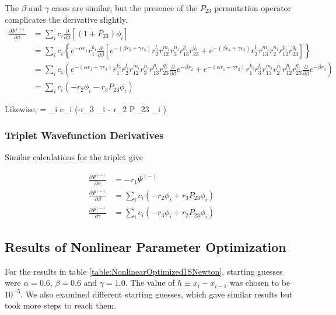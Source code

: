 \documentclass[Dissertation.tex]{subfiles}
\begin{document}
The $\beta$ and $\gamma$ cases are similar, but the presence of the $P_{23}$ permutation operator complicates the derivative slightly.
\begin{align}
\nonumber \frac{\partial \Psi^{(+)}}{\partial \beta} &= \sum_i c_i \frac{\partial}{\partial \beta} \left[(1+P_{23}) \phi_i \right] \\
\nonumber &= \sum_i c_i \left\{
  e^{-\alpha r_1} r_1^{k_i} \frac{\partial}{\partial \beta}
  \left[e^{-(\beta r_2 + \gamma r_3)} r_2^{l_i} r_{12}^{m_i} r_3^{n_i} r_{13}^{p_i} r_{23}^{q_i}
      + e^{-(\beta r_3 + \gamma r_2)} r_3^{l_i} r_{13}^{m_i} r_2^{n_i} r_{12}^{p_i} r_{23}^{q_i} \right] \right\} \\
\nonumber &= \sum_i c_i \left(
  e^{-(\alpha r_1 + \gamma r_3)} r_1^{k_i} r_2^{l_i} r_{12}^{m_i} r_3^{n_i} r_{13}^{p_i} r_{23}^{q_i} \frac{\partial}{\partial \beta} e^{-\beta r_2} +
  e^{-(\alpha r_1 + \gamma r_2)} r_1^{k_i} r_3^{l_i} r_{13}^{m_i} r_2^{n_i} r_{12}^{p_i} r_{23}^{q_i} \frac{\partial}{\partial \beta} e^{-\beta r_3} \right) \\
 &= \sum_i c_i \left(-r_2 \phi_i - r_3 P_{23} \phi_i \right) 
\label{eq:PsiDerBeta}
\end{align}

Likewise,
\beq
\frac{\partial \Psi^{(+)}}{\partial \gamma} = \sum_i c_i \left(-r_3 \phi_i - r_2 P_{23} \phi_i \right)
\label{eq:PsiDerGamma}
\eeq


\subsubsection{Triplet Wavefunction Derivatives}
Similar calculations for the triplet give

\begin{align}
\frac{\partial \Psi^{(-)}}{\partial \alpha} &= -r_1 \Psi^{(-)} \label{eq:PsiTripletDerAlpha} \\
\frac{\partial \Psi^{(-)}}{\partial \beta} &= \sum_i c_i \left(-r_2 \phi_i + r_3 P_{23} \phi_i \right) \label{eq:PsiTripletDerBeta} \\
\frac{\partial \Psi^{(-)}}{\partial \gamma} &= \sum_i c_i \left(-r_3 \phi_i + r_2 P_{23} \phi_i \right) \label{eq:PsiTripletDerGamma}
\end{align}


\subsection{Results of Nonlinear Parameter Optimization}

For the results in table \ref{table:NonlinearOptimized1SNewton}, starting guesses were $\alpha = 0.6$, $\beta = 0.6$ and $\gamma = 1.0$.  The value of $h \equiv x_i - x_{i-1}$ was chosen to be $10^{-5}$.  We also examined different starting guesses, which gave similar results but took more steps to reach them.
\end{document}
